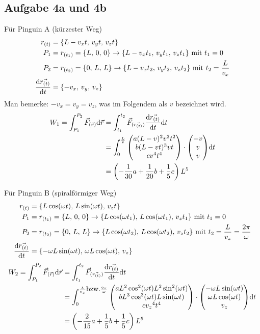 \documentclass[a4paper,10pt]{extarticle}
\begin{document}
\subsection*{Aufgabe 4a und 4b}
Für Pinguin A (kürzester Weg)
\begin{align*}
r_{(t)} &= \{L-v_xt,\, v_yt,\, v_zt \} \\
P_1 &= r_{(t_1)} = \{L , \, 0 , \, 0 \} \rightarrow \{L-v_xt_1,\, v_yt_1,\, v_zt_1 \} \,\, \mbox{mit} \,\, t_1 = 0 \\
P_2 &= r_{(t_2)} = \{0 , \, L , \, L \} \rightarrow \{L-v_xt_2,\, v_yt_2,\, v_zt_2 \} \,\, \mbox{mit} \,\, t_2 = \frac{L}{v_x} \\
\dv{\vec{r_{(t)}}}{t} &= \{-v_x ,\, v_y ,\, v_z \} \\
\end{align*}
Man bemerke: $-v_x = v_y = v_z$, was im Folgendem als $v$ bezeichnet wird.
\begin{align*}
W_1 = \int_{P_1}^{P_2} \vec{F}_{(\vec{r})} \dd \vec{r} &= \int_{t_1}^{t_2} \vec{F}_{( \vec{ r_{(t)} } )} \dv{\vec{r_{(t)}}}{t} \dd t \\
&= \int_0^{\frac{L}{v}} \mqty(a (L-v)^2 v^2 t^2 \\ b (L-vt)^3 v t \\ c v^4 t^4) \cdot \mqty(-v \\ v \\ v) \dd t \\
&= \left(-\frac{1}{30}a + \frac{1}{20}b + \frac{1}{5}c\right)L^5
\end{align*}

Für Pinguin B (spiralförmiger Weg)
\begin{align*}
r_{(t)} &= \{L\cos(\omega t) , \, L\sin(\omega t) ,\, v_zt \} \\
P_1 &= r_{(t_1)} = \{L , \, 0 , \, 0 \} \rightarrow \{L\cos(\omega t_1),\, L\cos(\omega t_1),\, v_zt_1 \} \,\, \mbox{mit} \,\, t_1 = 0 \\
P_2 &= r_{(t_2)} = \{0 , \, L , \, L \} \rightarrow \{L\cos(\omega t_2),\, L\cos(\omega t_2),\, v_zt_2 \} \,\, \mbox{mit} \,\, t_2 = \frac{L}{v_z} = \frac{2 \pi}{\omega} \\
\dv{\vec{r_{(t)}}}{t} &= \{- \omega L\sin(\omega t) ,\, \omega L\cos(\omega t) ,\, v_z \} \\
\end{align*}
\begin{align*}
W_2 = \int_{P_1}^{P_2} \vec{F}_{(\vec{r})} \dd \vec{r} &= \int_{t_1}^{t_2} \vec{F}_{( \vec{ r_{(t)} } )} \dv{\vec{r_{(t)}}}{t} \dd t \\
&= \int_0^{\frac{L}{v_z} \mbox{bzw.} \frac{2 \pi}{\omega}} \mqty(a L^2 \cos^2(\omega t) L^2 \sin^2(\omega t) \\ b L^3 \cos^3(\omega t) L \sin(\omega t) \\ c {v_z}^4 t^4) \cdot \mqty(- \omega L\sin(\omega t) \\ \omega L\cos(\omega t) \\ v_z) \dd t \\
&= \left(-\frac{2}{15}a + \frac{1}{5}b + \frac{1}{5}c\right)L^5
\end{align*}
\end{document}
